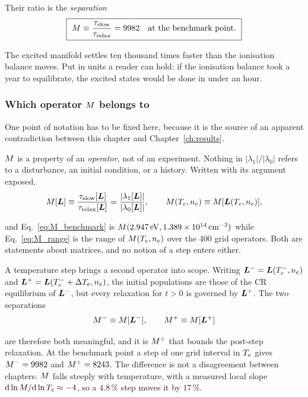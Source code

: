Their ratio is the \emph{separation}
\begin{equation}
  \boxed{\ M \equiv \frac{\tau_{\mathrm{slow}}}{\tau_{\mathrm{relax}}} = 9982
  \quad\text{at the benchmark point.}\ }
  \label{eq:M_benchmark}
\end{equation}

The excited manifold settles ten thousand times faster than the ionisation
balance moves. Put in units a reader can hold: if the ionisation balance took a
year to equilibrate, the excited states would be done in under an hour.

\subsubsection*{Which operator $M$ belongs to}

One point of notation has to be fixed here, because it is the source of an
apparent contradiction between this chapter and Chapter~\ref{ch:results}.

$M$ is a property of an \emph{operator}, not of an experiment. Nothing in
$|\lambda_1|/|\lambda_0|$ refers to a disturbance, an initial condition, or a
history. Written with its argument exposed,
\begin{equation}
  M[\bm{L}] \equiv \frac{\tau_{\mathrm{slow}}[\bm{L}]}{\tau_{\mathrm{relax}}[\bm{L}]}
  = \frac{|\lambda_1[\bm{L}]|}{|\lambda_0[\bm{L}]|},
  \qquad
  M(T_e,n_e) \equiv M[\bm{L}(T_e,n_e)],
  \label{eq:M_functional}
\end{equation}

\noindent and Eq.~\eqref{eq:M_benchmark} is $M(\SI{2.947}{\electronvolt},\SI{1.389e14}{\per\cubic\centi\metre})$ while
Eq.~\eqref{eq:M_range} is the range of $M(T_e,n_e)$ over the 400 grid
operators. Both are statements about matrices, and no notion of a step enters
either.

A temperature step brings a second operator into scope. Writing $\bm{L}^- =
\bm{L}(T_e^-,n_e)$ and $\bm{L}^+ = \bm{L}(T_e^-+\Delta T_e,n_e)$, the initial
populations are those of the CR equilibrium of $\bm{L}^-$, but every relaxation
for $t>0$ is governed by $\bm{L}^+$. The two separations
\begin{equation}
  M^- \equiv M[\bm{L}^-], \qquad M^+ \equiv M[\bm{L}^+]
  \label{eq:M_pre_post}
\end{equation}

\noindent are therefore both meaningful, and it is $M^+$ that bounds the
post-step relaxation. At the benchmark point a step of one grid interval in
$T_e$ gives $M^- = 9982$ and $M^+ = 8243$. The difference is not a
disagreement between chapters: $M$ falls steeply with temperature, with a
measured local slope $\mathrm{d}\ln M/\mathrm{d}\ln T_e \approx -4$, so a
$4.8\,\%$ step moves it by $17\,\%$.

